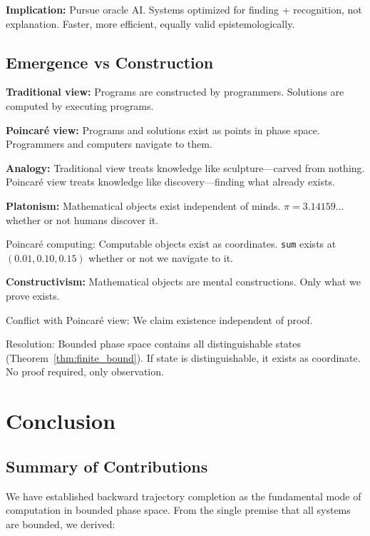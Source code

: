 \documentclass[twocolumn,10pt]{article}
\theoremstyle{definition}
\theoremstyle{remark}
\begin{document}
\vspace{0.2cm}
\noindent\textbf{Implication:} Pursue oracle AI. Systems optimized for finding + recognition, not explanation. Faster, more efficient, equally valid epistemologically.

\subsection{Emergence vs Construction}

\textbf{Traditional view:} Programs are constructed by programmers. Solutions are computed by executing programs.

\vspace{0.2cm}
\noindent\textbf{Poincaré view:} Programs and solutions exist as points in phase space. Programmers and computers navigate to them.

\vspace{0.2cm}
\noindent\textbf{Analogy:} Traditional view treats knowledge like sculpture—carved from nothing. Poincaré view treats knowledge like discovery—finding what already exists.

\vspace{0.2cm}
\noindent\textbf{Platonism:} Mathematical objects exist independent of minds. $\pi = 3.14159\ldots$ whether or not humans discover it.

Poincaré computing: Computable objects exist as coordinates. \texttt{sum} exists at $(0.01, 0.10, 0.15)$ whether or not we navigate to it.

\vspace{0.2cm}
\noindent\textbf{Constructivism:} Mathematical objects are mental constructions. Only what we prove exists.

Conflict with Poincaré view: We claim existence independent of proof.

Resolution: Bounded phase space contains all distinguishable states (Theorem~\ref{thm:finite_bound}). If state is distinguishable, it exists as coordinate. No proof required, only observation.

\section{Conclusion}
\label{sec:conclusion}

\subsection{Summary of Contributions}

We have established backward trajectory completion as the fundamental mode of computation in bounded phase space. From the single premise that all systems are bounded, we derived:
\end{document}
